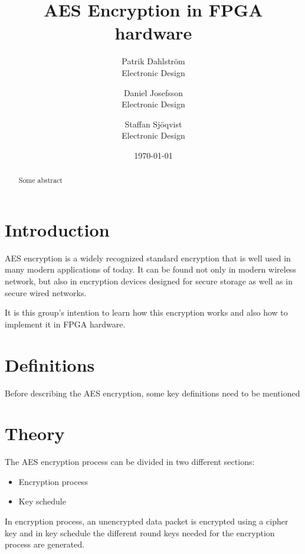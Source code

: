 \documentclass{report}
\title{AES Encryption in FPGA hardware}
\author{
        Patrik Dahlström \\
        Electronic Design\\
            \and
        Daniel Josefsson\\
        Electronic Design\\
            \and
        Staffan Sjöqvist\\
        Electronic Design
}}
\date{\today}
\begin{document}
\maketitle

\begin{abstract}
Some abstract
\end{abstract}

\chapter{Introduction}
AES encryption is a widely recognized standard encryption that is well used in many modern applications of today. It can be found not only in modern wireless network, but also in encryption devices designed for secure storage as well as in secure wired networks.

It is this group's intention to learn how this encryption works and also how to implement it in FPGA hardware.

\chapter{Definitions}
Before describing the AES encryption, some key definitions need to be mentioned



\chapter{Theory}
\label{sec:theory}
The AES encryption process can be divided in two different sections:
\begin{itemize}
\item Encryption process
\item Key schedule
\end{itemize}
In encryption process, an unencrypted data packet is encrypted using a cipher key and in key schedule the different round keys needed for the encryption process are generated.






\end{document}
